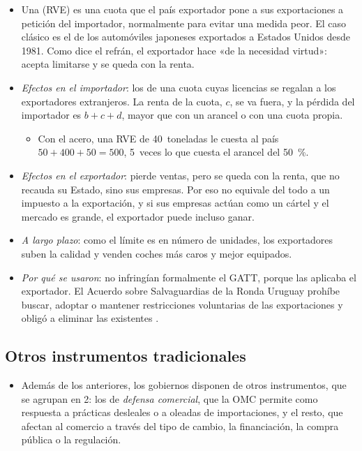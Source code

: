 \documentclass[11pt]{article}
\begin{document}
\begin{itemize}
\item Una  (RVE) es una cuota que el país exportador pone a sus exportaciones a petición del importador, normalmente para evitar una medida peor. El caso clásico es el de los automóviles japoneses exportados a Estados Unidos desde 1981. Como dice el refrán, el exportador hace «de la necesidad virtud»: acepta limitarse y se queda con la renta.
\item \emph{Efectos en el importador}: los de una cuota cuyas licencias se regalan a los exportadores extranjeros. La renta de la cuota, $c$, se va fuera, y la pérdida del importador es $b+c+d$, mayor que con un arancel o con una cuota propia.
  \begin{itemize}
  \item Con el acero, una RVE de 40~toneladas le cuesta al país $50+400+50=500$, 5~veces lo que cuesta el arancel del 50~\%.
  \end{itemize}
\item \emph{Efectos en el exportador}: pierde ventas, pero se queda con la renta, que no recauda su Estado, sino sus empresas. Por eso no equivale del todo a un impuesto a la exportación, y si sus empresas actúan como un cártel y el mercado es grande, el exportador puede incluso ganar.
\item \emph{A largo plazo}: como el límite es en número de unidades, los exportadores suben la calidad y venden coches más caros y mejor equipados\nocite{Feenstra1988Quality}.
\item \emph{Por qué se usaron}: no infringían formalmente el GATT, porque las aplicaba el exportador. El Acuerdo sobre Salvaguardias de la Ronda Uruguay prohíbe buscar, adoptar o mantener restricciones voluntarias de las exportaciones y obligó a eliminar las existentes\nocite{OMC1994Salvaguardias} .
\end{itemize}

\subsection{Otros instrumentos tradicionales}\label{sec:otros}

\begin{itemize}
\item Además de los anteriores, los gobiernos disponen de otros instrumentos, que se agrupan en 2: los de \emph{defensa comercial}, que la OMC permite como respuesta a prácticas desleales o a oleadas de importaciones, y el resto, que afectan al comercio a través del tipo de cambio, la financiación, la compra pública o la regulación\nocite{AppleyardField2014International}.
\end{itemize}
\end{document}
